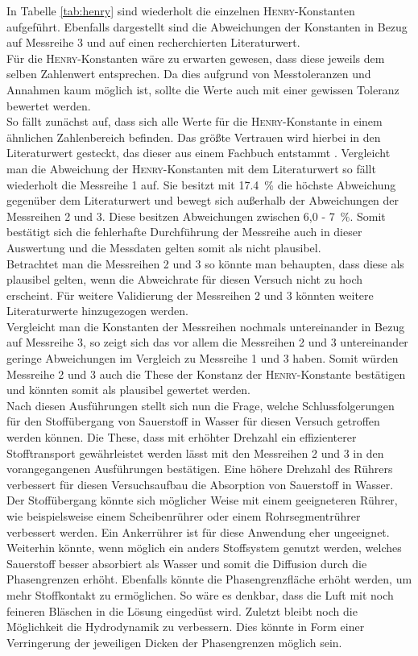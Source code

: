 In Tabelle \ref{tab:henry} sind wiederholt die einzelnen \textsc{Henry}-Konstanten aufgeführt. Ebenfalls dargestellt sind die Abweichungen der Konstanten in Bezug auf Messreihe 3 und auf einen recherchierten Literaturwert.\\
Für die \textsc{Henry}-Konstanten wäre zu erwarten gewesen, dass diese jeweils dem selben Zahlenwert entsprechen. Da dies aufgrund von Messtoleranzen und Annahmen kaum möglich ist, sollte die Werte auch mit einer gewissen Toleranz bewertet werden.\\
So fällt zunächst auf, dass sich alle Werte für die \textsc{Henry}-Konstante in einem ähnlichen Zahlenbereich befinden. Das größte Vertrauen wird hierbei in den Literaturwert gesteckt, das dieser aus einem Fachbuch entstammt \cite{Draxler.2014}. Vergleicht man die Abweichung der \textsc{Henry}-Konstanten mit dem Literaturwert so fällt wiederholt die Messreihe 1 auf. Sie besitzt mit \SI{17,4}{\percent } die höchste Abweichung gegenüber dem Literaturwert und bewegt sich außerhalb der Abweichungen der Messreihen 2 und 3. 
\newpage
Diese besitzen Abweichungen zwischen 6,0 - \SI{7}{\percent}. Somit bestätigt sich die fehlerhafte Durchführung der Messreihe auch in dieser Auswertung und die Messdaten gelten somit als nicht plausibel.\\
Betrachtet man die Messreihen 2 und 3 so könnte man behaupten, dass diese als plausibel gelten, wenn die Abweichrate für diesen Versuch nicht zu hoch erscheint. Für weitere Validierung der Messreihen 2 und 3 könnten weitere Literaturwerte hinzugezogen werden.\\
Vergleicht man die Konstanten der Messreihen nochmals untereinander in Bezug auf Messreihe 3, so zeigt sich das vor allem die Messreihen 2 und 3 untereinander geringe Abweichungen im Vergleich zu Messreihe 1 und 3 haben. Somit würden Messreihe 2 und 3 auch die These der Konstanz der \textsc{Henry}-Konstante bestätigen und könnten somit als plausibel gewertet werden.\\

Nach diesen Ausführungen stellt sich nun die Frage, welche Schlussfolgerungen für den Stoffübergang von Sauerstoff in Wasser für diesen Versuch getroffen werden können.
Die These, dass mit erhöhter Drehzahl ein effizienterer Stofftransport gewährleistet werden lässt mit den Messreihen 2 und 3 in den vorangegangenen Ausführungen bestätigen. Eine höhere Drehzahl des Rührers verbessert für diesen Versuchsaufbau die Absorption von Sauerstoff in Wasser. \\
Der Stoffübergang könnte sich möglicher Weise mit einem geeigneteren Rührer, wie beispielsweise einem Scheibenrührer oder einem Rohrsegmentrührer verbessert werden. Ein Ankerrührer ist für diese Anwendung eher ungeeignet.\\
Weiterhin könnte, wenn möglich ein anders Stoffsystem genutzt werden, welches Sauerstoff besser absorbiert als Wasser und somit die Diffusion durch die Phasengrenzen erhöht. Ebenfalls könnte die Phasengrenzfläche erhöht werden, um mehr Stoffkontakt zu ermöglichen. So wäre es denkbar, dass die Luft mit noch feineren Bläschen in die Lösung eingedüst wird. Zuletzt bleibt noch die Möglichkeit die Hydrodynamik zu verbessern. Dies könnte in Form einer Verringerung der jeweiligen Dicken der  Phasengrenzen möglich sein.
